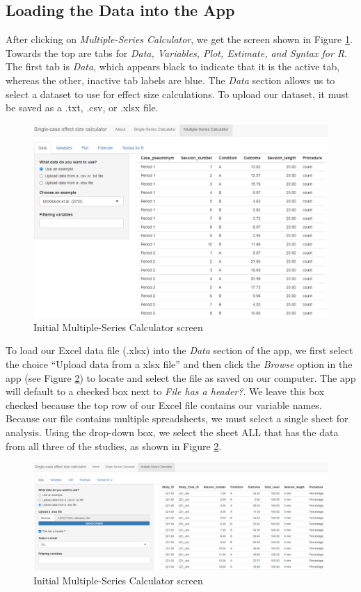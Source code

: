 \documentclass[
]{book}
\begin{document}
\hypertarget{loading-the-data-into-the-app}{%
\subsection{Loading the Data into the App}\label{loading-the-data-into-the-app}}

After clicking on \emph{Multiple-Series Calculator}, we get the screen shown in Figure \ref{fig:initial-multipleseries}. Towards the top are tabs for \emph{Data, Variables, Plot, Estimate, and Syntax for R}. The first tab is \emph{Data}, which appears black to indicate that it is the active tab, whereas the other, inactive tab labels are blue. The \emph{Data} section allows us to select a dataset to use for effect size calculations. To upload our dataset, it must be saved as a .txt, .csv, or .xlsx file.

\begin{figure}
\includegraphics[width=0.75\linewidth]{images/multiseries_data.1} \caption{Initial Multiple-Series Calculator screen}\label{fig:initial-multipleseries}
\end{figure}

To load our Excel data file (.xlsx) into the \emph{Data} section of the app, we first select the choice ``Upload data from a xlsx file'' and then click the \emph{Browse} option in the app (see Figure \ref{fig:multipleseries-data}) to locate and select the file as saved on our computer. The app will default to a checked box next to \emph{File has a header?}. We leave this box checked because the top row of our Excel file contains our variable names. Because our file contains multiple spreadsheets, we must select a single sheet for analysis. Using the drop-down box, we select the sheet ALL that has the data from all three of the studies, as shown in Figure \ref{fig:multipleseries-data}.

\begin{figure}
\includegraphics[width=0.75\linewidth]{images/multiseries_data.2} \caption{Initial Multiple-Series Calculator screen}\label{fig:multipleseries-data}
\end{figure}
\end{document}
